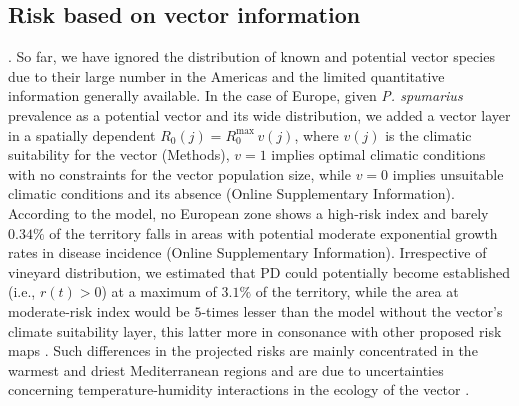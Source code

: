     \subsection{Risk based on vector information}. So far, we have ignored
    the
    distribution of known and potential vector species due to their large
    number in
    the Americas and the limited quantitative information generally available.
    In
    the case of Europe, given \textit{P. spumarius} prevalence as a potential
    vector and its wide distribution, we added	a vector layer in a spatially
    dependent $R_0(j) = R_0^{\textrm{max}}\, v(j)$, where $v(j)$ is the
    climatic
    suitability for the vector (Methods), $v=1$ implies optimal climatic
    conditions
    with no constraints for the vector population size, while $v=0$ implies
    unsuitable climatic conditions and its absence (Online Supplementary
    Information).
    According to the model, no European zone shows a high-risk index and barely
$0.34\%$ of the territory falls in areas with potential moderate exponential
    growth rates in disease incidence (Online Supplementary Information).
    Irrespective
    of
    vineyard
    distribution, we estimated that PD could potentially become established
    (i.e.,
$r(t) > 0$) at a maximum of $3.1\%$ of the territory, while the area at
    moderate-risk index would be $5$-times lesser than the model without the
    vector's climate suitability layer, this latter more in consonance with
    other
    proposed risk maps \cite{Godefroid2019,Bragard2019}. Such differences in
    the
    projected risks are mainly concentrated in the warmest and driest
    Mediterranean
    regions and are due to uncertainties concerning temperature-humidity
    interactions in the ecology of the vector \cite{Godefroid2021}.

